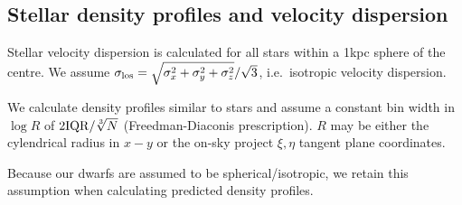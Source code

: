 \subsection{Stellar density profiles and velocity
dispersion}\label{stellar-density-profiles-and-velocity-dispersion}

Stellar velocity dispersion is calculated for all stars within a 1kpc
sphere of the centre. We assume
\(\sigma_{\rm los} = \sqrt{\sigma_x^2 + \sigma_y^2 + \sigma_z^2}/ \sqrt 3\),
i.e.~isotropic velocity dispersion.

We calculate density profiles similar to stars and assume a constant bin
width in \(\log R\) of \(2 {\rm IQR} / \sqrt[3]{N}\) (Freedman-Diaconis
prescription). \(R\) may be either the cylendrical radius in \(x-y\) or
the on-sky project \(\xi, \eta\) tangent plane coordinates.

Because our dwarfs are assumed to be spherical/isotropic, we retain this
assumption when calculating predicted density profiles.
